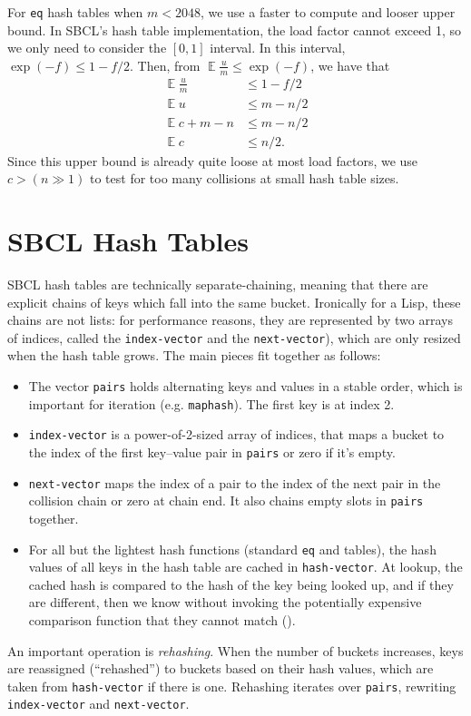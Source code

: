 \documentclass[sigconf]{acmart}
\newcommand*\lisp[1]{\texttt{#1}}
\newcommand{\E}{\mathop{{}\mathbb{E}}}
\renewcommand{\label}[1]{%
    \gdef\sfname{sf:##1}}%
\begin{document}
For \lisp{eq} hash tables when $m<2048$, we use a faster to compute and looser upper bound.
In SBCL's hash table implementation, the load factor cannot exceed 1, so we only need to consider the $[0,1]$ interval.
In this interval, $\exp(-f) \leqslant 1-f/2$.
Then, from $\E \frac{u}{m} \leqslant \exp(-f)$, we have that
\begin{align*}
\E \frac{u}{m} &\leqslant 1 - f/2\\
\E u &\leqslant m - n/2\\
\E c + m - n &\leqslant m - n/2\\
\E c &\leqslant n/2.
\end{align*}
Since this upper bound is already quite loose at most load factors, we use $c > (n \gg 1)$ to test for too many collisions at small hash table sizes.



\section{SBCL Hash Tables}
\label{sec:sbcl-hash-tables}

SBCL hash tables are technically separate-chaining, meaning that there are explicit chains of keys which fall into the same bucket.
Ironically for a Lisp, these chains are not lists: for performance reasons, they are represented by two arrays of indices, called the \lisp{index-vector} and the \lisp{next-vector}), which are only resized when the hash table grows.
The main pieces fit together as follows:
\begin{itemize}
\item The vector \lisp{pairs} holds alternating keys and values in a stable order, which is important for iteration (e.g. \lisp{maphash}).
The first key is at index 2.
\item \lisp{index-vector} is a power-of-2-sized array of indices, that maps a bucket to the index of the first key--value pair in \lisp{pairs} or zero if it's empty.
\item \lisp{next-vector} maps the index of a pair to the index of the next pair in the collision chain or zero at chain end.
It also chains empty slots in \lisp{pairs} together.
\item For all but the lightest hash functions (standard \lisp{eq} and  tables), the hash values of all keys in the hash table are cached in \lisp{hash-vector}.
At lookup, the cached hash is compared to the hash of the key being looked up, and if they are different, then we know without invoking the potentially expensive comparison function that they cannot match ().
\end{itemize}
An important operation is \emph{rehashing}.
When the number of buckets increases, keys are reassigned (``rehashed'') to buckets based on their hash values, which are taken from \lisp{hash-vector} if there is one.
Rehashing iterates over \lisp{pairs}, rewriting \lisp{index-vector} and \lisp{next-vector}.
\end{document}
